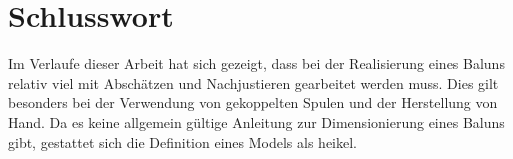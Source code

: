 \section{Schlusswort}
Im Verlaufe dieser Arbeit hat sich gezeigt, dass bei der Realisierung eines Baluns relativ viel mit Abschätzen und Nachjustieren gearbeitet werden muss. Dies gilt besonders bei der Verwendung von gekoppelten Spulen und der Herstellung von Hand.
Da es keine allgemein gültige Anleitung zur Dimensionierung eines Baluns gibt, gestattet sich die Definition eines Models als heikel.